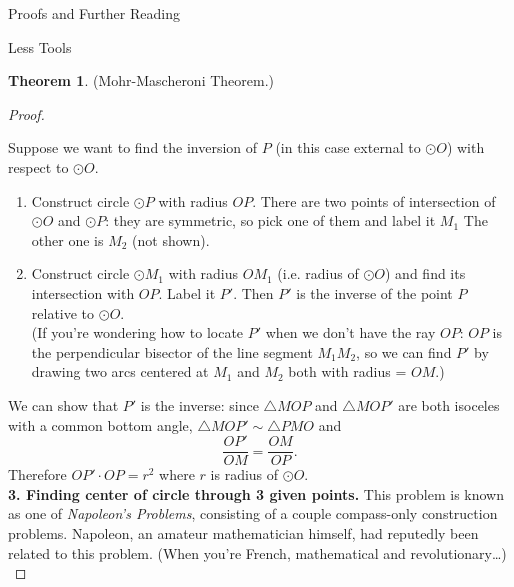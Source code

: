 \documentclass[12pt]{article}
\theoremstyle{definition}
\theoremstyle{definition}
\theoremstyle{definition}
\newtheorem{theorem}{Theorem}[section]
\theoremstyle{definition}
\theoremstyle{definition}
\theoremstyle{definition}
\theoremstyle{definition}
\begin{document}
\begin{section}{Proofs and Further Reading}
\begin{subsection}{Less Tools}
\begin{theorem}{(Mohr-Mascheroni Theorem.)}
\begin{proof}
\begin{figure}[H]
\begin{tikzpicture}[thick, scale=1.5]
                    \end{tikzpicture}
                \end{figure}
                Suppose we want to find the inversion of \(P\) (in this case external to \(\odot O\)) with respect to \(\odot O\).
                \begin{enumerate}
                    \item Construct circle \(\odot P\) with radius \(OP\). There are two points of intersection of \(\odot O\) and \(\odot P\):
                    they are symmetric, so pick one of them and label it \(M_1\) The other one is \(M_2\) (not shown).
                    \item Construct circle \(\odot M_1\) with radius \(OM_1\) (i.e. radius of \(\odot O\)) and find its intersection with \(OP\). Label 
                    it \(P'\). Then \(P'\) is the inverse of the point \(P\) relative to \(\odot O\).\\
                    (If you're wondering how to locate \(P'\) when we don't have the ray \(OP\): \(OP\) is the perpendicular bisector of the line segment 
                    \(M_1 M_2\), so we can find \(P'\) by drawing two arcs centered at \(M_1\) and \(M_2\) both with radius = \(OM\).)
                \end{enumerate}
                We can show that \(P'\) is the inverse: since \(\triangle MOP\) and \(\triangle MOP'\) are both isoceles with a common bottom angle, \(\triangle MOP' \sim \triangle PMO\)
                and 
                \[\frac{OP'}{OM} = \frac{OM}{OP}.\]
                Therefore \(OP' \cdot OP = r^2\) where \(r\) is radius of \(\odot O\).\\
                \break
                \noindent\textbf{3. Finding center of circle through 3 given points.} This problem is known as one of \textit{Napoleon's Problems}, consisting 
                of a couple compass-only construction problems. Napoleon, an amateur mathematician himself, had reputedly been related to this problem. (When you're French,
                mathematical and revolutionary\dots)\\
            \end{proof}
        \end{theorem}



\end{subsection}
\end{section}
\end{document}
